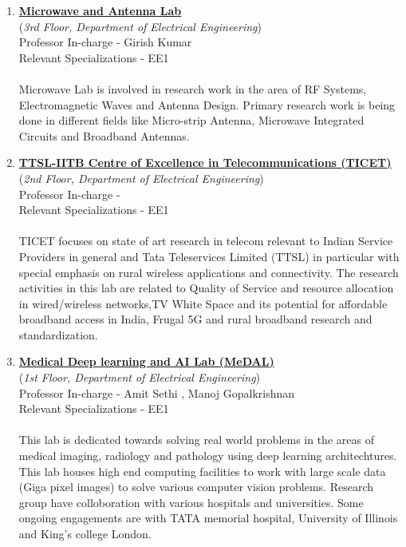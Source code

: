 \documentclass[openany]{book} %
\begin{document}
\begin{enumerate}
\item \href{https://www.ee.iitb.ac.in/~mwave/} {\color{blue} \textbf{Microwave and Antenna Lab}}\\
    (\textit{3rd Floor, Department of Electrical Engineering})\\
    Professor In-charge - Girish Kumar\\
Relevant Specializations - EE1\\
\\
Microwave Lab is involved in research work in the area of RF Systems, Electromagnetic Waves and Antenna Design. Primary research work is being done in different fields like Micro-strip Antenna, Microwave Integrated Circuits and Broadband Antennas.\\

\item \href{https://www.ee.iitb.ac.in/web/research/labs/ticet} {\color{blue} \textbf{TTSL-IITB Centre of Excellence in Telecommunications (TICET)}}\\
    (\textit{2nd Floor, Department of Electrical Engineering})\\
    Professor In-charge - \\
Relevant Specializations - EE1\\
\\
TICET focuses on state of art research in telecom relevant to Indian Service Providers in general and Tata Teleservices Limited (TTSL) in particular with special emphasis on rural wireless applications and connectivity. The research activities in this lab are related to Quality of Service and resource allocation in wired/wireless networks,TV White Space and its potential for affordable broadband access in India, Frugal 5G and rural broadband research and standardization.\\

\item \href{https://www.ee.iitb.ac.in/~asethi/research.html} {\color{blue} \textbf{Medical Deep learning and AI Lab (MeDAL)}}\\
    (\textit{1st Floor, Department of Electrical Engineering})\\
    Professor In-charge - Amit Sethi , Manoj Gopalkrishnan\\
Relevant Specializations - EE1\\
\\
This lab is dedicated towards solving real world problems in the areas of medical imaging, radiology and pathology using deep learning architechtures. This lab houses high end computing facilities to work with large scale data (Giga pixel images) to solve various computer vision problems. Research group have colloboration with various hospitals and universities. Some ongoing engagements are with TATA memorial hospital, University of Illinois and King's college London.\\


\end{enumerate}
\end{document}
